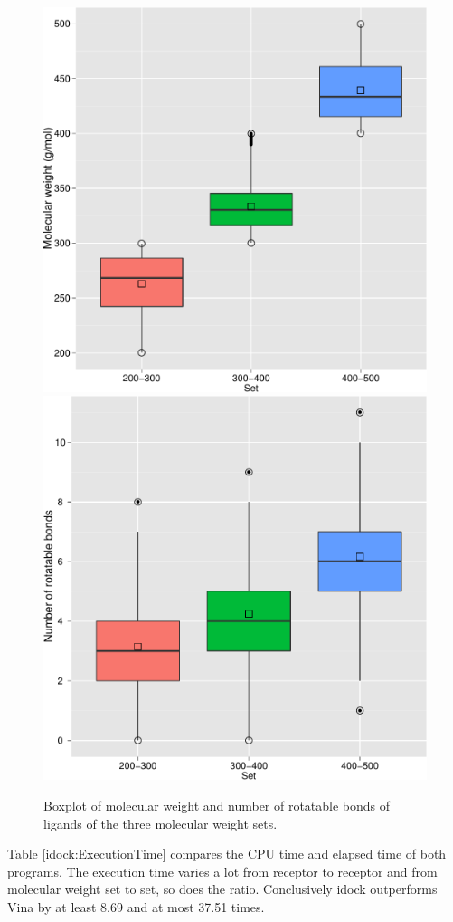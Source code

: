 \begin{figure}
\centering
\subfloat
{
  \includegraphics[width=0.485\linewidth]{idock/MWT.pdf}
}
\subfloat
{
  \includegraphics[width=0.485\linewidth]{idock/NRB.pdf}
}
\caption{Boxplot of molecular weight and number of rotatable bonds of ligands of the three molecular weight sets.}
\label{idock:MWT-NRB}
\end{figure}

Table \ref{idock:ExecutionTime} compares the CPU time and elapsed time of both programs. The execution time varies a lot from receptor to receptor and from molecular weight set to set, so does the ratio. Conclusively idock outperforms Vina by at least 8.69 and at most 37.51 times.

